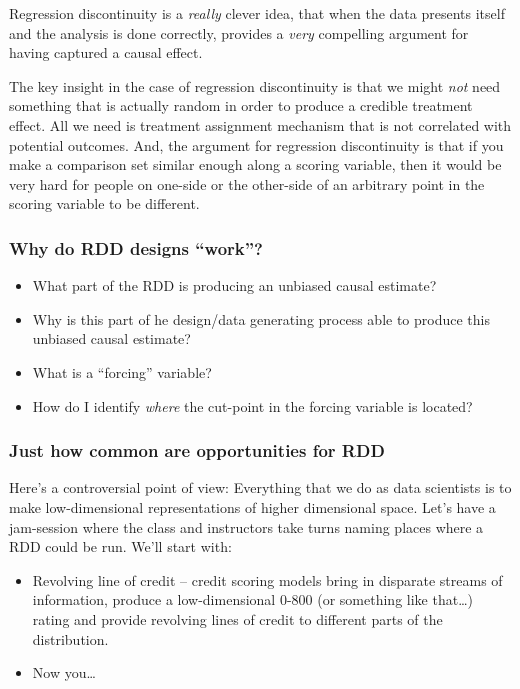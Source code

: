 \documentclass[
]{article}
\begin{document}
Regression discontinuity is a \emph{really} clever idea, that when the data presents itself and the analysis is done correctly, provides a \emph{very} compelling argument for having captured a causal effect.

The key insight in the case of regression discontinuity is that we might \emph{not} need something that is actually random in order to produce a credible treatment effect. All we need is treatment assignment mechanism that is not correlated with potential outcomes. And, the argument for regression discontinuity is that if you make a comparison set similar enough along a scoring variable, then it would be very hard for people on one-side or the other-side of an arbitrary point in the scoring variable to be different.

\hypertarget{why-do-rdd-designs-work}{%
\subsubsection{Why do RDD designs ``work''?}\label{why-do-rdd-designs-work}}

\begin{itemize}
\item
  What part of the RDD is producing an unbiased causal estimate?
\item
  Why is this part of he design/data generating process able to produce this unbiased causal estimate?
\item
  What is a ``forcing'' variable?
\item
  How do I identify \emph{where} the cut-point in the forcing variable is located?
\end{itemize}

\hypertarget{just-how-common-are-opportunities-for-rdd}{%
\subsubsection{Just how common are opportunities for RDD}\label{just-how-common-are-opportunities-for-rdd}}

Here's a controversial point of view: Everything that we do as data scientists is to make low-dimensional representations of higher dimensional space. Let's have a jam-session where the class and instructors take turns naming places where a RDD could be run. We'll start with:

\begin{itemize}
\item
  Revolving line of credit -- credit scoring models bring in disparate streams of information, produce a low-dimensional 0-800 (or something like that\ldots) rating and provide revolving lines of credit to different parts of the distribution.
\item
  Now you\ldots{}
\end{itemize}
\end{document}
